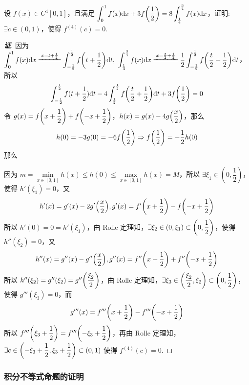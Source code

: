 \begin{example}
    设 $f(x)\in C^4[0,1]$，且满足 $\displaystyle \int_{0}^{1}f(x)\dd x+3f\qty(\dfrac{1}{2})=8\int_{\frac{1}{4}}^{\frac{3}{4}}f(x)\dd x$，证明: $\exists c\in(0,1)$，使得 $f^{(4)}(c)=0.$
\end{example}
\begin{proof}[{\songti \textbf{证}}]
    因为 $\displaystyle\int_{0}^{1}f(x)\dd x\xlongequal{x=t+\frac{1}{2}}\int_{-\frac{1}{2}}^{\frac{1}{2}}f\qty(t+\dfrac{1}{2})\dd t,~\int_{\frac{1}{4}}^{\frac{3}{4}}f(x)\dd x\xlongequal{x=\frac{t}{2}+\frac{1}{2}}\dfrac{1}{2}\int_{-\frac{1}{2}}^{\frac{1}{2}}f\qty(\dfrac{t}{2}+\dfrac{1}{2})\dd t$，所以
    $$\int_{-\frac{1}{2}}^{\frac{1}{2}}f(t+\dfrac{1}{2})\dd t-4\int_{\frac{1}{2}}^{\frac{1}{2}}f\qty(\dfrac{t}{2}+\dfrac{1}{2})\dd t +3f\qty(\dfrac{1}{2})=0$$
    令 $g(x)=f\qty(x+\dfrac{1}{2})+f\qty(-x+\dfrac{1}{2})$，$h(x)=g(x)-4g\qty(\dfrac{x}{2})$，那么
    $$h(0)=-3g(0)=-6f\qty(\dfrac{1}{2})\Rightarrow f\qty(\dfrac{1}{2})=-\dfrac{1}{2}h(0)$$
    那么
    因为 $m=\min\limits_{x\in[0,1]}h(x)\leqslant h(0)\leqslant \max\limits_{x\in[0,1]}h(x)=M$，所以 $\exists\xi_1\in(0,\dfrac{1}{2})$，使得 $h'(\xi_1)=0$，又
    $$h'(x)=g'(x)-2g'\qty(\dfrac{x}{2}),g'(x)=f'\qty(x+\dfrac{1}{2})-f\qty(-x+\dfrac{1}{2})$$
    所以 $h'(0)=0=h'(\xi_1)$，由 Rolle 定理知，$\exists\xi_2\in(0,\xi_1)\subset \qty(0,\dfrac{1}{2})$，使得 $h''(\xi_2)=0$，又
    $$h''(x)=g''(x)-g''\qty(\dfrac{x}{2}),g''(x)=f''\qty(x+\dfrac{1}{2})+f''\qty(-x+\dfrac{1}{2})$$
    所以 $h''(\xi_2)=g''(\xi_2)=g''\qty(\dfrac{\xi_2}{2})$，由 Rolle 定理知，$\exists\xi_3\in\qty(\dfrac{\xi_2}{2},\xi_2)\subset\qty(0,\dfrac{1}{2})$，使得 $g'''(\xi_3)=0$，而
    $$g'''(x)=f'''\qty(x+\dfrac{1}{2})-f'''\qty(-x+\dfrac{1}{2})$$
    所以 $f'''\qty(\xi_3+\dfrac{1}{2})=f'''\qty(-\xi_3+\dfrac{1}{2})$，再由 Rolle 定理知，$\exists c\in\qty(-\xi_3+\dfrac{1}{2},\xi_3+\dfrac{1}{2})\subset(0,1)$ 使得 $f^{(4)}(c)=0.$
\end{proof}

\subsubsection{积分不等式命题的证明}

